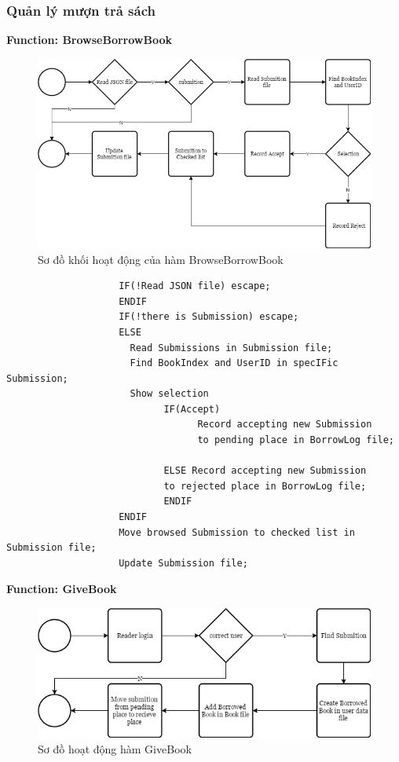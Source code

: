 \documentclass[12pt,a4paper]{report}
\begin{document}
            \subsubsection{Quản lý mượn trả sách}
                \textbf{Function: BrowseBorrowBook}
                \begin{figure}[H]
                    \centering
                    \label{F:browsebook}
                    \includegraphics[scale = .4]{browsebook.png}
                    \caption{Sơ đồ khối hoạt động của hàm BrowseBorrowBook}
                \end{figure}
                \begin{verbatim}
                    IF(!Read JSON file) escape;
                    ENDIF
                    IF(!there is Submission) escape;
                    ELSE
                      Read Submissions in Submission file;
                      Find BookIndex and UserID in specIFic Submission;
                      Show selection
                            IF(Accept)
                                  Record accepting new Submission
                                  to pending place in BorrowLog file;

                            ELSE Record accepting new Submission
                            to rejected place in BorrowLog file;
                            ENDIF
                    ENDIF
                    Move browsed Submission to checked list in Submission file;
                    Update Submission file;
                \end{verbatim}
                \newpage
                \textbf{Function: GiveBook}
                \begin{figure}[H]
                    \centering
                    \label{G:givebook}
                    \includegraphics[scale = .4]{givebook.png}
                    \caption{Sơ đồ hoạt động hàm GiveBook}
                \end{figure}
\end{document}
